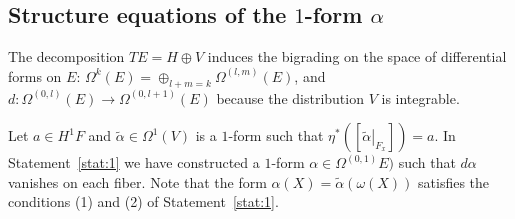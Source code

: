 \documentclass[12pt,letterpaper]{amsart}
\theoremstyle{definition}
\theoremstyle{plain}
\theoremstyle{remark}
\begin{document}
\subsection{Structure equations of the $1$-form $\alpha$}
\label{subsec:3_4}
The decomposition $TE = H \oplus V$ induces the bigrading on the space of differential forms on $E$: $\Omega^k(E) = \oplus_{l + m = k} \Omega^{(l, m)}(E)$, and $d : \Omega^{(0, l)}(E) \to \Omega^{(0, l+1)}(E)$ because the distribution $V$ is integrable.

Let $a \in H^1 F$ and $\widetilde{\alpha} \in \Omega^1(V)$ is a $1$-form such that
$\eta^*( [\left.\widetilde{\alpha}\right|_{F_x} ]) = a$.
In Statement~\ref{stat:1} we have constructed a $1$-form $\alpha \in \Omega^{(0, 1)}E)$ such that $d\alpha$ vanishes on each fiber.
Note that the form $\alpha(X) = \widetilde{\alpha}(\omega(X))$ satisfies the conditions (1) and (2) of Statement~\ref{stat:1}.
\end{document}
